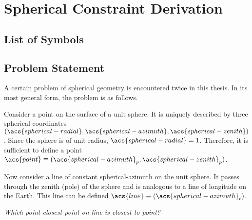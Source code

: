 \chapter{Spherical Constraint Derivation}\label{derivation}
\section*{List of Symbols}
\printacronyms[heading=none,include=math]
\section*{Problem Statement}
A certain problem of spherical geometry is encountered twice in this thesis. In its most general form, the problem is as follows. 

Consider a point on the surface of a unit sphere. It is uniquely described by three spherical coordinates $(\acs{spherical-radial},\acs{spherical-azimuth},\acs{spherical-zenith})$. Since the sphere is of unit radius, $\acs{spherical-radial}=1$. Therefore, it is sufficient to define a point $\acs{point}\equiv(\acs{spherical-azimuth}_p,\acs{spherical-zenith}_p)$.

Now consider a line of constant \acs{spherical-azimuth} on the unit sphere. It passes through the zenith (pole) of the sphere and is analogous to a line of longitude on the Earth. This line can be defined $\acs{line}\equiv(\acs{spherical-azimuth}_\ell)$.

\emph{Which point \acs{closest-point} on \acs{line} is closest to \acs{point}?}
